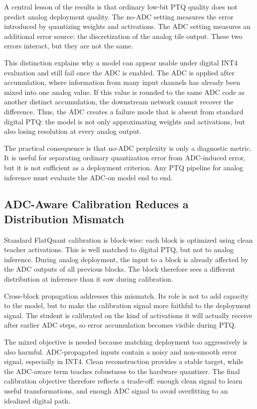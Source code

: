 \documentclass[a4paper,11pt,oneside]{article}
\theoremstyle{breakstyle}
\begin{document}
  A central lesson of the results is that ordinary low-bit PTQ quality
  does not predict analog deployment quality.  The no-ADC setting
  measures the error introduced by quantizing weights and activations.
  The ADC setting measures an additional error source: the discretization
  of the analog tile output.  These two errors interact, but they are not
  the same.

  This distinction explains why a model can appear usable under digital
  INT4 evaluation and still fail once the ADC is enabled.  The ADC is
  applied after accumulation, where information from many input channels
  has already been mixed into one analog value.  If this value is rounded
  to the same ADC code as another distinct accumulation, the downstream
  network cannot recover the difference.  Thus, the ADC creates a
  failure mode that is absent from standard digital PTQ: the model is not
  only approximating weights and activations, but also losing resolution
  at every analog output.

  The practical consequence is that no-ADC perplexity is only a
  diagnostic metric.  It is useful for separating ordinary quantization
  error from ADC-induced error, but it is not sufficient as a deployment
  criterion.  Any PTQ pipeline for analog inference must evaluate the
  ADC-on model end to end.

  \subsection{ADC-Aware Calibration Reduces a Distribution Mismatch}

  Standard FlatQuant calibration is block-wise: each block is optimized
  using clean teacher activations.  This is well matched to digital PTQ,
  but not to analog inference.  During analog deployment, the input to a
  block is already affected by the ADC outputs of all previous blocks.
  The block therefore sees a different distribution at inference than it
  saw during calibration.

  Cross-block propagation addresses this mismatch.  Its role is not to
  add capacity to the model, but to make the calibration signal more
  faithful to the deployment signal.  The student is calibrated on the
  kind of activations it will actually receive after earlier ADC steps,
  so error accumulation becomes visible during PTQ.

  The mixed objective is needed because matching deployment too
  aggressively is also harmful.  ADC-propagated inputs contain a noisy
  and non-smooth error signal, especially in INT4.  Clean reconstruction
  provides a stable target, while the ADC-aware term teaches robustness
  to the hardware quantizer.  The final calibration objective therefore
  reflects a trade-off: enough clean signal to learn useful
  transformations, and enough ADC signal to avoid overfitting to an
  idealized digital path.
\end{document}
